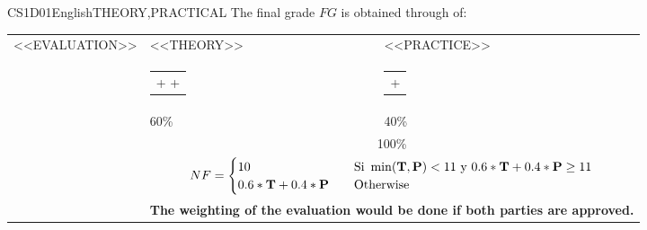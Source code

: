   \begin{evaluation}{CS1D01}{English}{THEORY,PRACTICAL}
    The final grade $FG$ is obtained through of:

    \begin{tabularx}{0.9\textwidth}{|X|p{}|p{}|} \hline
    \multirow{4}{*}{\uppercase{<<Evaluation>>}} & \uppercase{<<Theory>>} & \uppercase{<<Practice>>} \\ \cline{2-3}
    & %
        \begin{minipage}{0.95\textwidth}
      \begin{tabular}{l}
          $\text{\textbf{T}} = [<<ExamAcronym>>_{1}$  +
          $<<ExamAcronym>>_{2}$  +
          $<<ExamAcronym>>_{3}]/3$
          \end{tabular}
      \end{minipage}
  & %
      \begin{minipage}{0.95\textwidth}
      \begin{tabular}{l}
          $\text{\textbf{P}} = [<<ContinuousAssessmentAcronym>>_{1}$ +
          $<<ContinuousAssessmentAcronym>>_{2}]/2$
      \end{tabular}
      \end{minipage}                 \\ \cline{2-3}
  
    & %
    60\% 
    & %
    40\% \\ \cline{2-3}
    & \multicolumn{2}{c|}{100\%}  \\ \cline{2-3}
    & \multicolumn{2}{c|}{
      \begin{math}
        NF =
        \begin{cases}
          10     & \quad \text{Si } \min(\text{\textbf{T}},\text{\textbf{P}}) < 11 \text{ y } 0.6*\text{\textbf{T}} + 0.4*\text{\textbf{P}} \geq 11 \\
        0.6*\text{\textbf{T}} + 0.4*\text{\textbf{P}}  & \quad \text{Otherwise}
        \end{cases}
      \end{math}
    } \\ \cline{2-3}
    & \multicolumn{2}{c|}{\textbf{The weighting of the evaluation would be done if both parties are approved.}}  \\ \hline
    \end{tabularx}
        

\end{evaluation}
